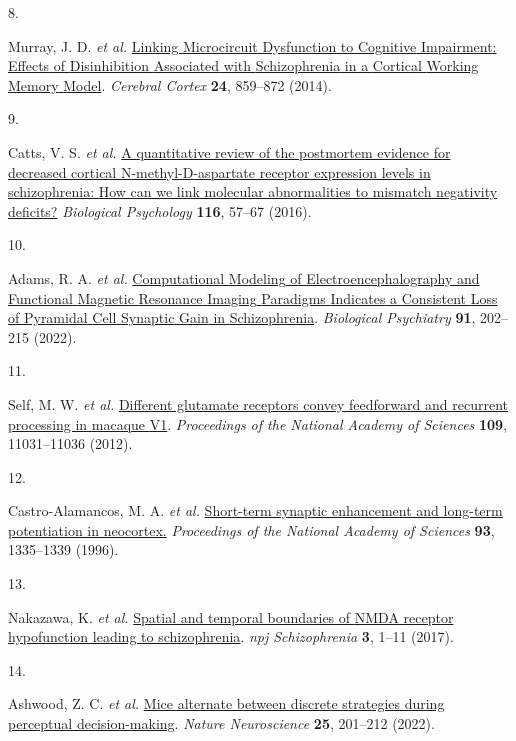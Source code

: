 \documentclass[
]{article}
\newlength{\cslhangindent}
\newlength{\csllabelwidth}
\newenvironment{CSLReferences}[2] %
 {\begin{list}{}{%
  \setlength{\itemindent}{0pt}
  \setlength{\leftmargin}{0pt}
  \setlength{\parsep}{0pt}
  \ifodd #1
   \setlength{\leftmargin}{\cslhangindent}
   \setlength{\itemindent}{-1\cslhangindent}
  \fi
  \setlength{\itemsep}{#2\baselineskip}}}
 {\end{list}}
\newcommand{\CSLLeftMargin}[1]{\parbox[t]{\csllabelwidth}{\strut#1\strut}}
\newcommand{\CSLRightInline}[1]{\parbox[t]{\linewidth - \csllabelwidth}{\strut#1\strut}}
\begin{document}
\begin{CSLReferences}{0}{0}
\CSLLeftMargin{8. }%
\CSLRightInline{Murray, J. D. \emph{et al.}
\href{https://doi.org/10.1093/cercor/bhs370}{Linking {Microcircuit}
{Dysfunction} to {Cognitive} {Impairment}: {Effects} of {Disinhibition}
{Associated} with {Schizophrenia} in a {Cortical} {Working} {Memory}
{Model}}. \emph{Cerebral Cortex} \textbf{24}, 859--872 (2014).}

\CSLLeftMargin{9. }%
\CSLRightInline{Catts, V. S. \emph{et al.}
\href{https://doi.org/10.1016/j.biopsycho.2015.10.013}{A quantitative
review of the postmortem evidence for decreased cortical
{N}-methyl-{D}-aspartate receptor expression levels in schizophrenia:
{How} can we link molecular abnormalities to mismatch negativity
deficits?} \emph{Biological Psychology} \textbf{116}, 57--67 (2016).}

\CSLLeftMargin{10. }%
\CSLRightInline{Adams, R. A. \emph{et al.}
\href{https://doi.org/10.1016/j.biopsych.2021.07.024}{Computational
{Modeling} of {Electroencephalography} and {Functional} {Magnetic}
{Resonance} {Imaging} {Paradigms} {Indicates} a {Consistent} {Loss} of
{Pyramidal} {Cell} {Synaptic} {Gain} in {Schizophrenia}}.
\emph{Biological Psychiatry} \textbf{91}, 202--215 (2022).}

\CSLLeftMargin{11. }%
\CSLRightInline{Self, M. W. \emph{et al.}
\href{https://doi.org/10.1073/pnas.1119527109}{Different glutamate
receptors convey feedforward and recurrent processing in macaque {V1}}.
\emph{Proceedings of the National Academy of Sciences} \textbf{109},
11031--11036 (2012).}

\CSLLeftMargin{12. }%
\CSLRightInline{Castro-Alamancos, M. A. \emph{et al.}
\href{https://doi.org/10.1073/pnas.93.3.1335}{Short-term synaptic
enhancement and long-term potentiation in neocortex.} \emph{Proceedings
of the National Academy of Sciences} \textbf{93}, 1335--1339 (1996).}

\CSLLeftMargin{13. }%
\CSLRightInline{Nakazawa, K. \emph{et al.}
\href{https://doi.org/10.1038/s41537-016-0003-3}{Spatial and temporal
boundaries of {NMDA} receptor hypofunction leading to schizophrenia}.
\emph{npj Schizophrenia} \textbf{3}, 1--11 (2017).}

\CSLLeftMargin{14. }%
\CSLRightInline{Ashwood, Z. C. \emph{et al.}
\href{https://doi.org/10.1038/s41593-021-01007-z}{Mice alternate between
discrete strategies during perceptual decision-making}. \emph{Nature
Neuroscience} \textbf{25}, 201--212 (2022).}


\end{CSLReferences}
\end{document}
